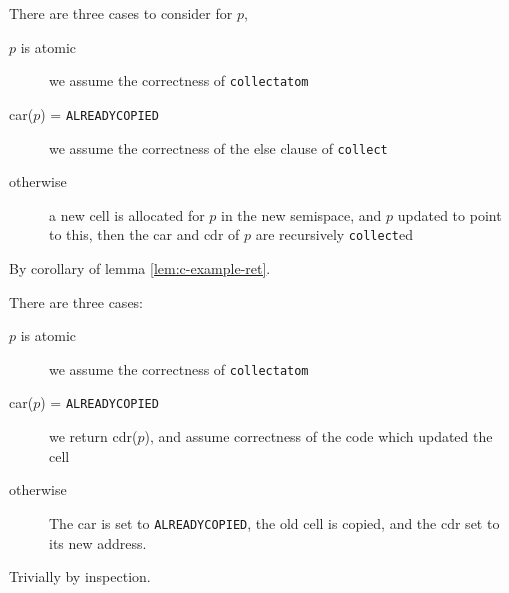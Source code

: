 \begin{lemma}
  \label{lem:c-example-reach}
  There are three cases to consider for $p$,

  \begin{description}
  \item[$p$ is atomic] we assume the correctness of
    \texttt{collectatom}

  \item[car($p$) = \texttt{ALREADYCOPIED}] we assume the correctness
    of the else clause of \texttt{collect}

  \item[otherwise] a new cell is allocated for $p$ in the new
    semispace, and $p$ updated to point to this, then the car and cdr
    of $p$ are recursively \texttt{collect}ed
  \end{description}
\end{lemma}

\begin{lemma}
  \label{lem:c-example-duplication}
  By corollary of lemma \ref{lem:c-example-ret}.
\end{lemma}

\begin{lemma}
  \label{lem:c-example-ret}
  There are three cases:

  \begin{description}
  \item[$p$ is atomic] we assume the correctness of
    \texttt{collectatom}

  \item[car($p$) = \texttt{ALREADYCOPIED}] we return cdr($p$), and
    assume correctness of the code which updated the cell

  \item[otherwise] The car is set to \texttt{ALREADYCOPIED}, the old
    cell is copied, and the cdr set to its new address.
  \end{description}
\end{lemma}

\begin{lemma}
  \label{lem:c-example-update}
  Trivially by inspection.
\end{lemma}

